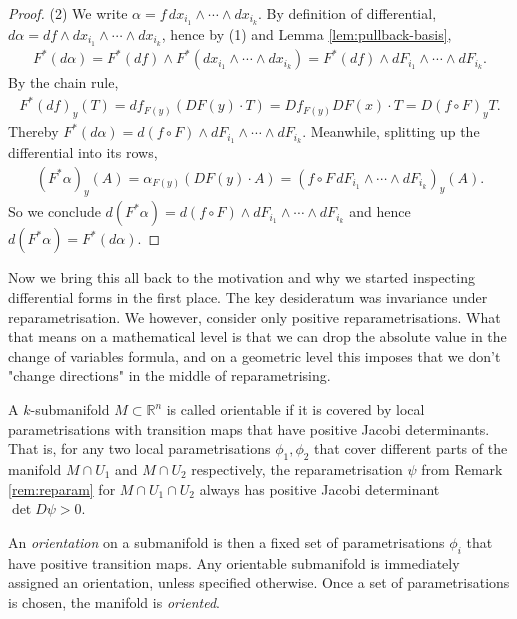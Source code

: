 \begin{proof}
	(2) We write $\alpha = f \, dx_{i_{1}} \wedge \cdots \wedge dx_{i_{k}}$. By definition of differential,
	$d\alpha = df \wedge dx_{i_{1}} \wedge \cdots \wedge dx_{i_{k}}$, hence by (1) and Lemma \ref{lem:pullback-basis},
	\begin{align*}
		F^*(d\alpha ) = F^*(df) \wedge F^*(dx_{i_{1}} \wedge \cdots \wedge dx_{i_{k}}) = F^*(df) \wedge dF_{i_{1}} \wedge \cdots \wedge dF_{i_{k}}.
	\end{align*}
	By the chain rule,
	\begin{align*}
		F^*(df)_{y}(T) = df_{F(y)}(DF(y) \cdot T) = Df_{F(y)} DF(x) \cdot T = D(f \circ F)_{y}T.
	\end{align*}
	Thereby $F^*(d\alpha ) = d(f \circ F) \wedge dF_{i_{1}} \wedge \cdots \wedge dF_{i_{k}}$. Meanwhile, splitting up the differential into its rows,
	\begin{align*}
		(F^*\alpha)_{y}(A) = \alpha_{F(y)}(DF(y) \cdot A) = (f \circ F \, dF_{i_{1}} \wedge \cdots \wedge dF_{i_{k}})_{y}(A).
	\end{align*}
	So we conclude $d(F^*\alpha ) = d(f \circ F) \wedge dF_{i_{1}} \wedge \cdots \wedge dF_{i_{k}}$ and hence $d(F^*\alpha ) = F^*(d \alpha )$.
\end{proof}

Now we bring this all back to the motivation and why we started inspecting differential forms in the first place. The key desideratum was invariance under reparametrisation. We however, consider only positive reparametrisations. What that means on a mathematical level is that we can drop the absolute value in the change of variables formula, and on a geometric level this imposes that we don't "change directions" in the middle of reparametrising. 

\begin{definition}\label{def:orientable-subm}
	A $k$-submanifold $M \subset \mathbb{R}^{n}$ is called orientable if it is covered by local parametrisations with transition maps that have positive Jacobi determinants. That is, for any two local parametrisations $\phi_{1}, \phi_{2}$ that cover different parts of the manifold $M \cap U_{1}$ and $M \cap U_{2}$ respectively, the reparametrisation $\psi$ from Remark \ref{rem:reparam} for $M \cap U_{1} \cap U_{2}$ always has positive Jacobi determinant $\det D\psi > 0$.

	An \textit{orientation} on a submanifold is then a fixed set of parametrisations $\phi_{i}$ that have positive transition maps. Any orientable submanifold is immediately assigned an orientation, unless specified otherwise. Once a set of parametrisations is chosen, the manifold is \textit{oriented}.
\end{definition}

